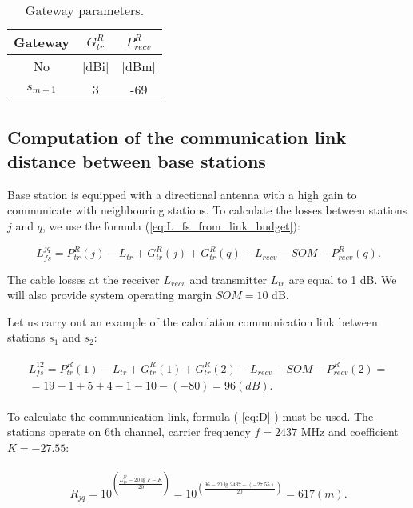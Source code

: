 \begin{table}[h!]\begin{center}
  \begin{tabular}{|c||c|c|}\hline
    Gateway & $G_{tr}^R$ & $P_{recv}^R$  \\ \hline 
     No & [dBi] & [dBm]  \\ \hline
    $s_{m+1}$ & 3 & -69 \\ \hline

\end{tabular}\caption{Gateway parameters.}
\label{tab:Gateway}
\end{center}\end{table}

\subsection{Computation of the communication link distance between base stations}

Base station is equipped with a directional antenna with a high gain to communicate with neighbouring stations.
To calculate the losses between stations $j$ and $q$, we use the formula (\ref{eq:L_fs_from_link_budget}):

\begin{displaymath}
  L_{fs}^{jq} = P_{tr}^R(j) - L_{tr} + G_{tr}^R(j) + G_{tr}^R(q) - L_{recv} - SOM - P_{recv}^R(q).
\end{displaymath}

The cable losses at the receiver $L_{recv}$ and transmitter $L_{tr}$ are equal to 1 dB. We will also provide system operating margin $ SOM = 10 $ dB.

Let us carry out an example of the calculation communication link between stations $ s_1 $ and $ s_2 $:

\begin{align}
  \begin{aligned}
  L_{fs}^{12} = P_{tr}^R(1) - L_{tr} + G_{tr}^R(1) + G_{tr}^R(2) - L_{recv} - SOM - P_{recv}^R(2)= \\
  = 19 - 1 + 5 + 4 - 1 - 10 - (-80) = 96 (dB).
  \end{aligned}
\end{align}

To calculate the communication link, formula ( \ref{eq:D} ) must be used. The stations operate on 6th channel, carrier frequency $f = 2437$ MHz and coefficient $K = -27.55$:

\begin{align}
  \begin{aligned}
  R_{jq} = 10^{\left(\frac{L_{fs}^{jq} - 20\lg{F} - K}{20}\right)}
  = 10^{\left(\frac{96 - 20\lg{2437} - (-27.55)}{20}\right)} = 617 (m).
  \end{aligned}
\end{align}

